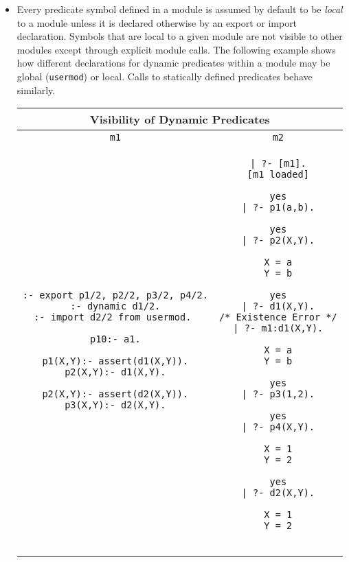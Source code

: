 \begin{itemize}
\begin{center}
\begin{tabular}{cc}
\begin{minipage}{14.5em}
\begin{verbatim}
\end{verbatim}
\end{minipage}
\\ \hline \hline
\end{tabular}
\end{center}
%
\item Every predicate symbol defined in a module is assumed by default
  to be {\em local} to a module unless it is declared otherwise by an
  export or import declaration.  Symbols that are local to a given
  module are not visible to other modules except through explicit
  module calls.  The following example shows how different
  declarations for dynamic predicates within a module may be global
  ({\tt usermod}) or local.  Calls to statically defined predicates
  behave similarly.
%
\begin{center}
\begin{tabular}{cc}\hline \hline
\multicolumn{2}{c}{\rule{0ex}{2.5ex}\textbf{Visibility of Dynamic Predicates}} \\ \hline \hline
\rule[-2ex]{0ex}{5ex} \texttt{m1} & \texttt{m2} \\
\begin{minipage}{20.5em}
\begin{verbatim}
:- export p1/2, p2/2, p3/2, p4/2.
:- dynamic d1/2.
:- import d2/2 from usermod. 

p10:- a1.

p1(X,Y):- assert(d1(X,Y)).
p2(X,Y):- d1(X,Y).

p2(X,Y):- assert(d2(X,Y)).
p3(X,Y):- d2(X,Y).
\end{verbatim}
\end{minipage}
&
\begin{minipage}{14.5em}
\begin{verbatim}
| ?- [m1].
[m1 loaded]

yes
| ?- p1(a,b).

yes
| ?- p2(X,Y).

X = a
Y = b

yes
| ?- d1(X,Y).
/* Existence Error */
| ?- m1:d1(X,Y).

X = a
Y = b

yes
| ?- p3(1,2).

yes
| ?- p4(X,Y).

X = 1
Y = 2

yes
| ?- d2(X,Y).

X = 1
Y = 2


\end{verbatim}
\end{minipage}
\end{tabular}
\end{center}
\end{itemize}
